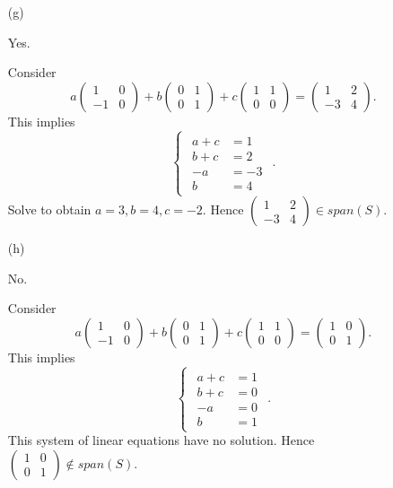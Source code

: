 \begin{Exercise}
\begin{enumerate}[(a)]
\item[(g)]
\begin{answer}
Yes.
\end{answer}
\begin{solution}
Consider
$$
a\begin{pmatrix}
1 & 0 \\
-1 & 0
\end{pmatrix} + b\begin{pmatrix}
0 & 1 \\
0 & 1
\end{pmatrix} + c\begin{pmatrix}
1 & 1 \\
0 & 0
\end{pmatrix} = \begin{pmatrix}
1 & 2 \\
-3 & 4
\end{pmatrix}.
$$
This implies
$$
\begin{cases}
\begin{aligned}
a+c &= 1 \\
b+c &= 2 \\
-a &= -3 \\
b &= 4
\end{aligned}
\end{cases}.
$$
Solve to obtain $a=3,b=4,c=-2$. Hence
$
\begin{pmatrix}
1 & 2 \\
-3 & 4
\end{pmatrix} \in span(S).
$
\end{solution}

\item[(h)]
\begin{answer}
No.
\end{answer}
\begin{solution}
Consider
$$
a\begin{pmatrix}
1 & 0 \\
-1 & 0
\end{pmatrix} + b\begin{pmatrix}
0 & 1 \\
0 & 1
\end{pmatrix} + c\begin{pmatrix}
1 & 1 \\
0 & 0
\end{pmatrix} = \begin{pmatrix}
1 & 0 \\
0 & 1
\end{pmatrix}.
$$
This implies
$$
\begin{cases}
\begin{aligned}
a+c &= 1 \\
b+c &= 0 \\
-a &= 0 \\
b &= 1
\end{aligned}
\end{cases}.
$$
This system of linear equations have no solution. Hence 
$
\begin{pmatrix}
1 & 0 \\
0 & 1
\end{pmatrix} \notin span(S).
$
\end{solution}
\end{enumerate}
\end{Exercise}